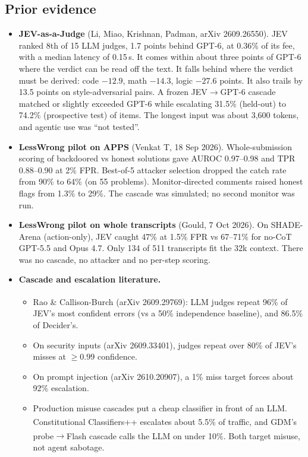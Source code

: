 \documentclass[11pt]{article}
\newcommand{\uv}{\textsuperscript{\dag}}
\begin{document}
\subsection{Prior evidence}
\begin{itemize}
\item \textbf{JEV-as-a-Judge} (Li, Miao, Krishnan, Padman, arXiv 2609.26550). JEV ranked 8th of 15 LLM judges, 1.7 points behind GPT-6, at 0.36\% of its fee, with a median latency of 0.15\,s. It comes within about three points of GPT-6 where the verdict can be read off the text. It falls behind where the verdict must be derived: code $-12.9$, math $-14.3$, logic $-27.6$ points. It also trails by 13.5 points on style-adversarial pairs. A frozen JEV$\to$GPT-6 cascade matched or slightly exceeded GPT-6 while escalating 31.5\% (held-out) to 74.2\% (prospective test) of items. The longest input was about 3{,}600 tokens, and agentic use was ``not tested''.
\item \textbf{LessWrong pilot on APPS} (Venkat T, 18 Sep 2026). Whole-submission scoring of backdoored vs honest solutions gave AUROC 0.97--0.98 and TPR 0.88--0.90 at 2\% FPR. Best-of-5 attacker selection dropped the catch rate from 90\% to 64\% (on 55 problems). Monitor-directed comments raised honest flags from 1.3\% to 29\%. The cascade was simulated; no second monitor was run.
\item \textbf{LessWrong pilot on whole transcripts} (Gould, 7 Oct 2026). On SHADE-Arena (action-only), JEV caught 47\% at 1.5\% FPR vs 67--71\% for no-CoT GPT-5.5 and Opus 4.7. Only 134 of 511 transcripts fit the 32k context. There was no cascade, no attacker and no per-step scoring.
\item \textbf{Cascade and escalation literature.}
  \begin{itemize}
  \item Rao \& Callison-Burch (arXiv 2609.29769\uv): LLM judges repeat 96\% of JEV's most confident errors (vs a 50\% independence baseline), and 86.5\% of Decider's.
  \item On security inputs (arXiv 2609.33401), judges repeat over 80\% of JEV's misses at $\ge0.99$ confidence.
  \item On prompt injection (arXiv 2610.20907), a 1\% miss target forces about 92\% escalation.
  \item Production misuse cascades put a cheap classifier in front of an LLM. Constitutional Classifiers++ escalates about 5.5\% of traffic\uv, and GDM's probe$\to$Flash cascade calls the LLM on under 10\%\uv. Both target misuse, not agent sabotage.

\end{itemize}
\end{itemize}
\end{document}
